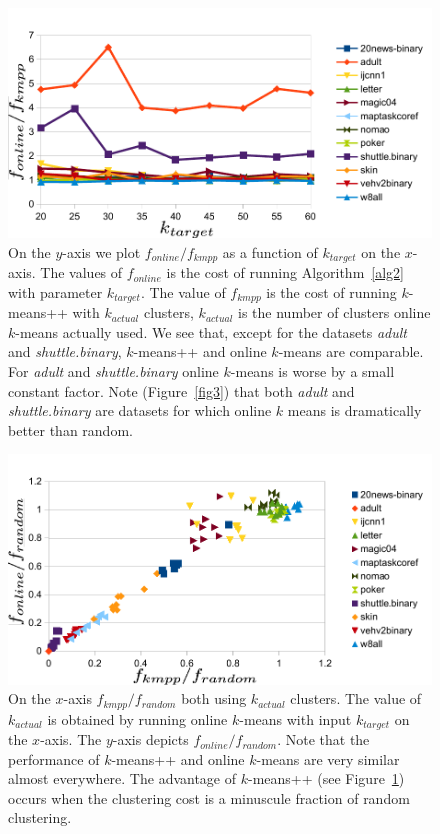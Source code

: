\documentclass[11pt,twoside]{article}
\begin{document}
\begin{figure}[htbp]
\begin{center}
\includegraphics{figures/plot4.pdf}
\caption{On the $y$-axis we plot $f_{online}/f_{kmpp}$ as a function of $k_{target}$ on the $x$-axis. The values of $f_{online}$ is the cost of running Algorithm~\ref{alg2} with parameter $k_{target}$.
The value of $f_{kmpp}$ is the cost of running $k$-means++ with $k_{actual}$ clusters, $k_{actual}$ is the number of clusters online $k$-means actually used.
We see that, except for the datasets \emph{adult} and \emph{shuttle.binary}, $k$-means++ and online $k$-means are comparable. For \emph{adult} and \emph{shuttle.binary} online $k$-means is worse by a small constant factor. Note (Figure~\ref{fig3}) that both \emph{adult} and \emph{shuttle.binary} are datasets for which online $k$ means is dramatically better than random.}
\label{fig4}
\end{center}
\end{figure}

\begin{figure}[htbp]
\begin{center}
\includegraphics{figures/plot5.pdf}
\caption{On the $x$-axis $f_{kmpp}/f_{random}$ both using $k_{actual}$ clusters. 
The value of $k_{actual}$ is obtained by running online $k$-means with input $k_{target}$ on the $x$-axis.
The $y$-axis depicts $f_{online}/f_{random}$. 
Note that the performance of $k$-means++ and online $k$-means are very similar almost everywhere.
The advantage of $k$-means++ (see Figure~\ref{fig4}) occurs when the clustering cost is a minuscule fraction of random clustering.}
\label{fig5}
\end{center}
\end{figure}
  
\end{document}
